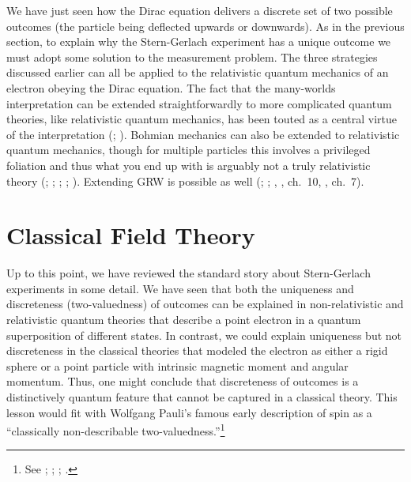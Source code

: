 \documentclass[12pt,secnumarabic,amsmath,amssymb,balancelastpage,nofootinbib]{article}
\begin{document}
We have just seen how the Dirac equation delivers a discrete set of two possible outcomes (the particle being deflected upwards or downwards).  As in the previous section, to explain why the Stern-Gerlach experiment has a unique outcome we must adopt some solution to the measurement problem.  The three strategies discussed earlier can all be applied to the relativistic quantum mechanics of an electron obeying the Dirac equation.  The fact that the many-worlds interpretation can be extended straightforwardly to more complicated quantum theories, like relativistic quantum mechanics, has been touted as a central virtue of the interpretation (\citealp[sec.\ 1.7]{wallaceQM}; \citealp{wallace2020}).  Bohmian mechanics can also be extended to relativistic quantum mechanics, though for multiple particles this involves a privileged foliation and thus what you end up with is arguably not a truly relativistic theory (\citealp{bohm1953}; \citealp[ch.\ 12]{bohmhiley}; \citealp[sec.\ 12.2]{holland}; \citealp{durr2014}; \citealp[sec.\ 3.1]{tumulka2018}).  Extending GRW is possible as well (\citealp{tumulka2006}; \citealp{bedingham2014}; \citeauthor{maudlin2011}, \citeyear{maudlin2011}, ch.\ 10, \citeyear{maudlinQM}, ch.\ 7).












\section{Classical Field Theory}\label{cftsection}

Up to this point, we have reviewed the standard story about Stern-Gerlach experiments in some detail.  We have seen that both the uniqueness and discreteness (two-valuedness) of outcomes can be explained in non-relativistic and relativistic quantum theories that describe a point electron in a quantum superposition of different states.  In contrast, we could explain uniqueness but not discreteness in the classical theories that modeled the electron as either a rigid sphere or a point particle with intrinsic magnetic moment and angular momentum.  Thus, one might conclude that discreteness of outcomes is a distinctively quantum feature that cannot be captured in a classical theory.  This lesson would fit with Wolfgang Pauli's famous early description of spin as a ``classically non-describable two-valuedness.''\footnote{See \citet{pauli1925, pauli1946}; \citet[ch.\ 2]{tomonaga1997}; \citet{morrison2007, giulini2008}; \citet[sec.\ 7.4]{deregt}.}
\end{document}
